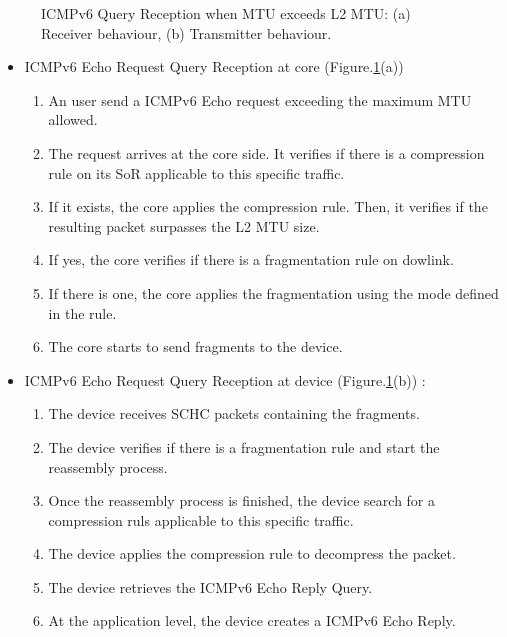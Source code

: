 \documentclass[onecolumn,12pt]{book}
\newcounter{c}
\begin{document}
\begin{figure}[!tbp]
  \begin{minipage}[b]{0.33\columnwidth}
  \centering
    
  \end{minipage}
  \hfill
  \begin{minipage}[b]{0.33\columnwidth}
  \centering
    
  \end{minipage}
\caption{ICMPv6 Query Reception when MTU exceeds L2 MTU: (a) Receiver behaviour, (b) Transmitter behaviour.}    \label{fig:icmpv6_query}
\end{figure}

\begin{itemize}
    \item ICMPv6 Echo Request Query Reception at core (Figure.\ref{fig:icmpv6_query}(a))
\begin{enumerate}
    \item An user send a ICMPv6 Echo request exceeding the maximum MTU allowed.
    \item The request arrives at the core side. It verifies if there is a compression rule on its SoR applicable to this specific traffic.
    \item If it exists, the core applies the compression rule. 
    Then, it verifies if the resulting packet surpasses the L2 MTU size.
    \item If yes, the core verifies if there is a fragmentation rule on dowlink.
    \item If there is one, the core applies the fragmentation using the mode defined in the rule.
    \item The core starts to send fragments to the device.
    \end{enumerate}

\item ICMPv6 Echo Request Query Reception at device (Figure.\ref{fig:icmpv6_query}(b)) : 
\begin{enumerate}
    \item The device receives SCHC packets containing the fragments.
    \item The device verifies if there is a fragmentation rule and start the reassembly process.
    \item Once the reassembly process is finished, the device search for a compression ruls applicable to this specific traffic.
    \item The device applies the compression rule to decompress the packet.
    \item The device retrieves the ICMPv6 Echo Reply Query.
    \item At the application level, the device creates a ICMPv6 Echo Reply.
\end{enumerate}


\end{itemize}
\end{document}
